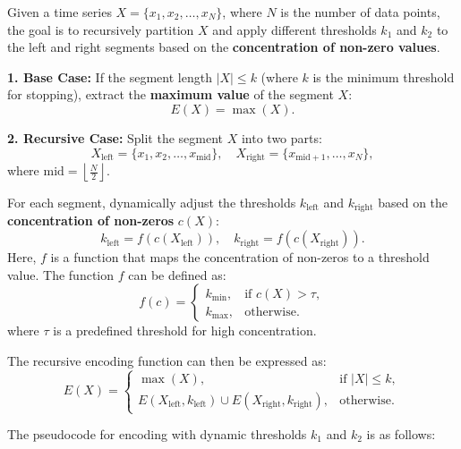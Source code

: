 \documentclass[onecolumn,conference]{IEEEtran}
\begin{document}
Given a time series \( X = \{x_1, x_2, \dots, x_N\} \), where \( N \) is the number of data points, the goal is to recursively partition \( X \) and apply different thresholds \( k_1 \) and \( k_2 \) to the left and right segments based on the \textbf{concentration of non-zero values}.


\noindent \textbf{1. Base Case:} If the segment length \( |X| \leq k \) (where \( k \) is the minimum threshold for stopping), extract the \textbf{maximum value} of the segment \( X \):
\[
E(X) = \max(X).
\]

\noindent \textbf{2. Recursive Case:} Split the segment \( X \) into two parts:
\[
X_{\text{left}} = \{x_1, x_2, \dots, x_{\text{mid}}\}, \quad X_{\text{right}} = \{x_{\text{mid}+1}, \dots, x_N\},
\]
where \( \text{mid} = \left\lfloor \frac{N}{2} \right\rfloor \).

For each segment, dynamically adjust the thresholds \( k_{\text{left}} \) and \( k_{\text{right}} \) based on the \textbf{concentration of non-zeros} \( c(X) \):
\[
k_{\text{left}} = f(c(X_{\text{left}})), \quad k_{\text{right}} = f(c(X_{\text{right}})).
\]
Here, \( f \) is a function that maps the concentration of non-zeros to a threshold value. The function \( f \) can be defined as:
\[
f(c) = \begin{cases} 
k_{\text{min}}, & \text{if } c(X) > \tau, \\
k_{\text{max}}, & \text{otherwise}.
\end{cases}
\]
where \( \tau \) is a predefined threshold for high concentration.

The recursive encoding function can then be expressed as:
\[
E(X) = 
\begin{cases} 
\max(X), & \text{if } |X| \leq k, \\
E(X_{\text{left}}, k_{\text{left}}) \cup E(X_{\text{right}}, k_{\text{right}}), & \text{otherwise}.
\end{cases}
\]

The pseudocode for encoding with dynamic thresholds \( k_1 \) and \( k_2 \) is as follows:
\end{document}
